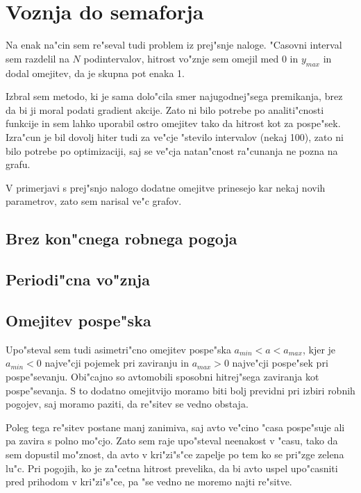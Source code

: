\documentclass[a4paper,10pt]{article}
\newcommand{\naboji}[1]{
  
\begin{figure}
  \subfigure{}
  \subfigure{}\\
  \subfigure{}
  \subfigure{}
\end{figure}

}
\begin{document}
\naboji{10}
\naboji{5}

\section{Voznja do semaforja}
Na enak na"cin sem re"seval tudi problem iz prej"snje naloge. "Casovni interval sem razdelil na $N$ podintervalov, hitrost vo"znje sem omejil med 0 in $y_{max}$ in dodal omejitev, da je skupna pot enaka 1. 

Izbral sem metodo, ki je sama dolo"cila smer najugodnej"sega premikanja, brez da bi ji moral podati gradient akcije. Zato ni bilo potrebe po analiti"cnosti funkcije in sem lahko uporabil ostro omejitev tako da hitrost kot za pospe"sek. Izra"cun je bil dovolj hiter tudi za ve"cje "stevilo intervalov (nekaj 100), zato ni bilo potrebe po optimizaciji, saj se ve"cja natan"cnost ra"cunanja ne pozna na grafu. 

V primerjavi s prej"snjo nalogo dodatne omejitve prinesejo kar nekaj novih parametrov, zato sem narisal ve"c grafov. 

\subsection{Brez kon"cnega robnega pogoja}




\subsection{Periodi"cna vo"znja}






\subsection{Omejitev pospe"ska}
Upo"steval sem tudi asimetri"cno omejitev pospe"ska $a_{min} < a < a_{max}$, kjer je $a_{min}<0$ najve"cji pojemek pri zaviranju in $a_{max} > 0$ najve"cji pospe"sek pri pospe"sevanju. Obi"cajno so avtomobili sposobni hitrej"sega zaviranja kot pospe"sevanja. S to dodatno omejitvijo moramo biti bolj previdni pri izbiri robnih pogojev, saj moramo paziti, da re"sitev se vedno obstaja. 

Poleg tega re"sitev postane manj zanimiva, saj avto ve"cino "casa pospe"suje ali pa zavira s polno mo"cjo. Zato sem raje upo"steval neenakost v "casu, tako da sem dopustil mo"znost, da avto v kri"zi"s"ce zapelje po tem ko se pri"zge zelena lu"c. Pri pogojih, ko je za"cetna hitrost prevelika, da bi avto uspel upo"casniti pred prihodom v kri"zi"s"ce, pa "se vedno ne moremo najti re"sitve. 
\end{document}
